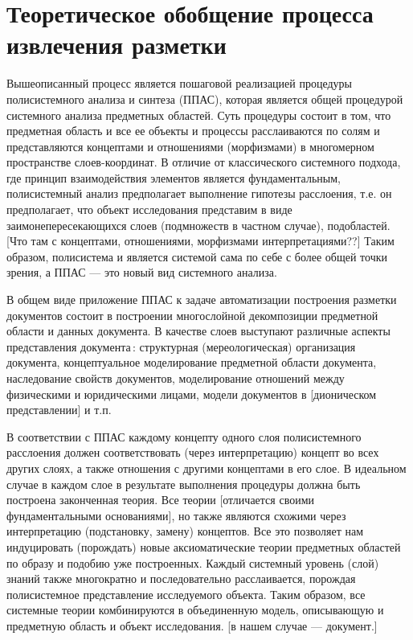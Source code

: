 \documentclass[utf8]{../IncArticle}
\newcommand{\e}[2][fcolor]{\textcolor{pcolor}{[}\textcolor{#1}{#2}\textcolor{pcolor}{]}}
\begin{document}
\section{Теоретическое обобщение процесса извлечения разметки}

Вышеописанный процесс является пошаговой реализацией процедуры
полисистемного анализа и синтеза \cite{father} (ППАС), которая
является общей процедурой системного анализа предметных областей.
Суть процедуры состоит в том, что предметная область и все ее объекты
и процессы расслаиваются по солям и представляются концептами и
отношениями (морфизмами) в многомерном пространстве слоев-координат.
В отличие от классического системного подхода, где принцип
взаимодействия элементов является фундаментальным, полисистемный
анализ предполагает выполнение гипотезы расслоения, т.е. он
предполагает, что объект исследования представим в виде
заимонепересекающихся слоев (подмножеств в частном случае),
подобластей. \e{Что там с концептами, отношениями, морфизмами интерпретациями??}  Таким образом, полисистема и является системой сама по
себе с более общей точки зрения, а ППАС --- это новый вид системного
анализа.

В общем виде приложение ППАС к задаче автоматизации построения
разметки документов состоит в построении многослойной декомпозиции
предметной области и данных документа. В качестве слоев выступают
различные аспекты представления документа\,: структурная
(мереологическая) организация документа, концептуальное моделирование
предметной области документа, наследование свойств документов,
моделирование отношений между физическими и юридическими лицами,
модели документов в \e{дионическом представлении} и т.п.

В соответствии с ППАС \cite{father} каждому концепту одного слоя
полисистемного расслоения должен соответствовать (через интерпретацию)
концепт во всех других слоях, а также отношения с другими концептами в
его слое.  В идеальном случае в каждом слое в результате выполнения
процедуры должна быть построена законченная теория.  Все теории
\e{отличается своими фундаментальными основаниями}, но также являются
схожими через интерпретацию (подстановку, замену) концептов.  Все это
позволяет нам индуцировать (порождать) новые аксиоматические теории
предметных областей по образу и подобию уже построенных.  Каждый
системный уровень (слой) знаний также многократно и последовательно расслаивается,
порождая полисистемное представление исследуемого объекта.  Таким
образом, все системные теории комбинируются в объединенную модель,
описывающую и предметную область и объект исследования.  \e{в нашем
  случае --- документ.}
\end{document}
